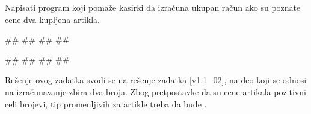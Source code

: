 \begin{Exercise}[label=p1_005]
Napisati program koji pomaže kasirki da izračuna ukupan račun ako su poznate cene dva kupljena artikla. 

\begin{miditest}
\begin{upotreba}{1}
#\naslovInt#
##
##
##
\end{upotreba}
\end{miditest}
\begin{miditest}
\begin{upotreba}{2}
#\naslovInt#
##
##
##
\end{upotreba}
\end{miditest}

\end{Exercise}
\begin{Answer}[ref=p1_005]

Rešenje ovog zadatka svodi se na rešenje zadatka \ref{v1.1_02}, na deo koji se odnosi na izračunavanje zbira dva broja. Zbog pretpostavke da su cene artikala pozitivni celi brojevi, tip promenljivih za artikle treba da bude .
\end{Answer}

